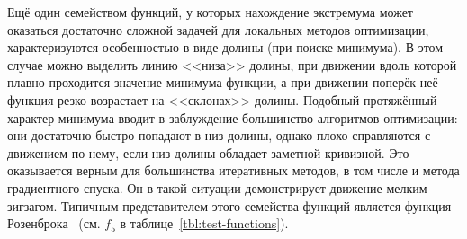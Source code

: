 Ещё один семейством функций, у которых нахождение экстремума может
оказаться достаточно сложной задачей для локальных методов
оптимизации, характеризуются особенностью в виде долины (при поиске
минимума). В этом случае можно выделить линию <<низа>> долины, при
движении вдоль которой плавно проходится значение минимума функции, а
при движении поперёк неё функция резко возрастает на <<склонах>>
долины. Подобный протяжённый характер минимума вводит в заблуждение
большинство алгоритмов оптимизации: они достаточно быстро попадают в
низ долины, однако плохо справляются с движением по нему, если низ
долины обладает заметной кривизной. Это оказывается верным для
большинства итеративных методов, в том числе и метода градиентного
спуска. Он в такой ситуации демонстрирует движение мелким
зигзагом. Типичным представителем этого семейства функций является
функция Розенброка~\cite{Rosenbrock-1960}
(см. $f_5$ в таблице~\ref{tbl:test-functions}).

